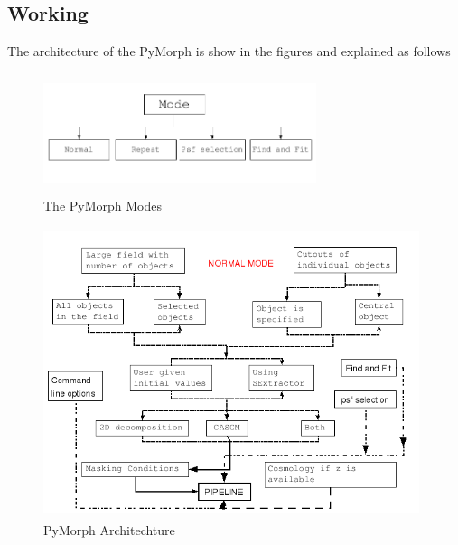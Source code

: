 \documentclass[a4paper,12pt]{article}
\begin{document}
\subsection{Working}
The architecture of the PyMorph is show in the figures and explained as follows

 \begin{figure}[tbh!]
 \centering
 \includegraphics[width=8cm, height=3.5cm, bb=0 0 641 234]{pipeline-arch1.png}
 \caption{The PyMorph Modes}
 \label{fig:arch1}
\end{figure}

\begin{figure}[tbh!]
 \centering
 \includegraphics[width=11cm, height=8.5cm, bb=0 0 656 492]{pipeline-arch2.png}
 \caption{PyMorph Architechture}
 \label{fig:arch2}
\end{figure}
\end{document}
